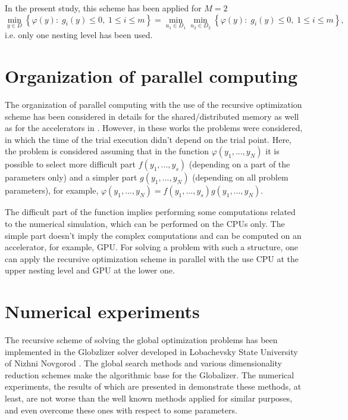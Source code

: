 \documentclass[a4paper]{jpconf}
\begin{document}
In the present study, this scheme has been applied for $M=2$
\[
\min_{y \in D}{\left\{\varphi(y): \; g_i(y)\leq 0, \; 1 \leq i \leq 
m\right\}}= \min_{u_1\in D_1}\min_{u_2\in D_2}{\left\{\varphi(y): \; 
g_i(y)\leq 0, \; 1 \leq i \leq m\right\}},
\]
i.e. only one nesting level has been used.

\section{Organization of parallel computing}\label{sec:4}

The organization of parallel computing with the use of the recursive 
optimization scheme has been considered in details for the shared/distributed 
memory as well as for the accelerators in \cite{BarkalovGergelLebedev2016,BarkalovLebedev}. However, in these works the 
problems were considered, in which the time of the trial execution didn't 
depend on the trial point. Here, the problem is considered assuming that in 
the function $\varphi(y_1,...,y_N)$ it is possible to select more difficult 
part $f(y_1,...,y_s)$ (depending on a part of the parameters only) and a simpler 
part $g(y_1,...,y_N)$ (depending on all problem parameters), for 
example, $\varphi(y_1,...,y_N)= f(y_1,...,y_s)g(y_1,...,y_N)$.

The difficult part of the function implies performing some  
computations related to the numerical simulation, which can be performed on the 
CPUs only. The simple part doesn't imply the complex computations and can be 
computed on an accelerator, for example, GPU. For solving a problem with such 
a structure, one can apply the recursive optimization scheme in parallel with 
the use CPU at the upper nesting level and GPU at the lower one.

\section{Numerical experiments}\label{sec:5}

The recursive scheme of solving the global optimization problems has been 
implemented in the Globzlizer solver developed in Lobachevsky State 
University of Nizhni Novgorod \cite{Globalizer,Globalizer1}. The global search methods and various 
dimensionality reduction schemes make the algorithmic base for the 
Globalizer. The numerical experiments, the results of which are presented in 
\cite{GergelLebedev,GergelSidorov} demonstrate these methods, at least, are not worse than the well known 
methods applied for similar purposes, and even overcome these ones with 
respect to some parameters. 
\end{document}
